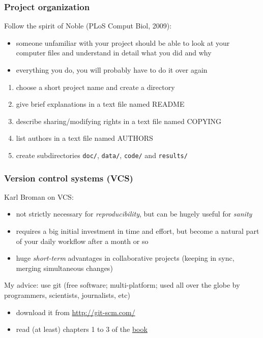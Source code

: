 \documentclass[c]{beamer} %
\begin{document}
\begin{frame}[fragile]
  \frametitle{Project organization}
  Follow the spirit of Noble (PLoS Comput Biol, 2009):
  \begin{itemize}
  \item someone unfamiliar with your project should be able to look at your computer files and understand in detail what you did and why
  \item everything you do, you will probably have to do it over again
  \end{itemize}
  
  \bigskip
  \pause
  
  \begin{enumerate}
  \item choose a short project name and create a directory
  \item give brief explanations in a text file named README
  \item describe sharing/modifying rights in a text file named COPYING
  \item list authors in a text file named AUTHORS
  \item create subdirectories \verb+doc/+, \verb+data/+, \verb+code/+ and \verb+results/+
  \end{enumerate}
\end{frame}

\begin{frame}
  \frametitle{Version control systems (VCS)}
  Karl Broman on VCS:
  \begin{itemize}
  \item not strictly necessary for \emph{reproducibility}, but can be hugely useful for \emph{sanity}
  \item requires a big initial investment in time and effort, but become a natural part of your daily workflow after a month or so
  \item huge \emph{short-term} advantages in collaborative projects (keeping in sync, merging simultaneous changes)
  \end{itemize}
  
  \bigskip
  \pause
  
  My advice: use \alert{git} (free software; multi-platform; used all over the globe by programmers, scientists, journalists, etc)
  \begin{itemize}
  \item download it from \url{http://git-scm.com/}
  \item read (at least) chapters 1 to 3 of the \href{http://git-scm.com/book/en/v2}{book}
  \end{itemize}
\end{frame}
\end{document}
